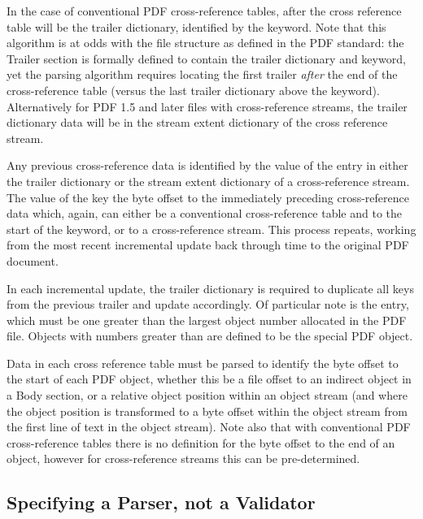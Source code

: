 In the case of conventional PDF
cross-reference tables, after the cross reference table will be the
trailer dictionary, identified by the  keyword. 
Note that this algorithm is at
odds with the file structure as defined in the PDF standard: the Trailer section is formally defined
to contain the trailer dictionary and  keyword, yet the parsing algorithm
requires locating the first trailer \emph{after} the end of the cross-reference table 
(versus the last trailer dictionary above the  keyword). 
Alternatively for PDF 1.5 and later files with cross-reference
streams, the trailer dictionary data will be in the stream extent
dictionary of the cross reference stream. 

Any previous cross-reference data is identified by the value of the  entry in either
the trailer dictionary or the stream extent dictionary of a cross-reference stream. The
value of the  key the byte offset to the immediately
preceding cross-reference data which, again, can either be a conventional
cross-reference table and to the start of the  keyword, or to a
cross-reference stream. This process repeats, working from the most recent incremental
update back through time to the original PDF document.

In each incremental update, the trailer dictionary is required to duplicate all keys from the previous
trailer and update accordingly. Of particular note is the  entry, which must be
one greater than the largest object number allocated in the PDF file. Objects with numbers greater
than  are defined to be the special PDF  object.

Data in each cross reference table must be parsed to
identify the byte offset to the start of each PDF object, whether this be a file offset to an indirect object in a Body section, or a relative object position within an object stream (and where the object position is transformed to a byte offset within the object stream from the first line of text in the object stream). Note also that with conventional PDF cross-reference tables there is no definition for the byte offset to the end of an object, however for cross-reference streams this can be pre-determined.


\subsection{Specifying a Parser, not a Validator}
\label{sec:spec-approach}

